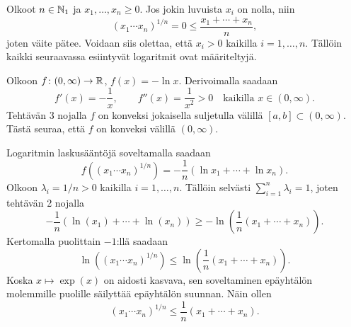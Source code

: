 \documentclass[11pt,a4paper]{amsart}
\begin{document}
\begin{solution}
  Olkoot \(n\in\mathbb{N}_1\) ja \(x_1,\ldots,x_n\geq 0\).
  Jos jokin luvuista \(x_i\) on nolla, niin
  \[
    (x_1\cdots x_n)^{1/n}=0\leq\frac{x_1+\cdots+x_n}{n},
  \]
  joten väite pätee. Voidaan siis olettaa, että \(x_i>0\) kaikilla
  \(i=1,\ldots,n\). Tällöin kaikki seuraavassa esiintyvät logaritmit
  ovat määriteltyjä.

  Olkoon \(f\colon(0,\infty)\to\mathbb{R}\), \(f(x)=-\ln x\).
  Derivoimalla saadaan
  \[
    f'(x)=-\frac{1}{x},
    \qquad f''(x)=\frac{1}{x^2}>0
    \quad\text{kaikilla }x\in(0,\infty).
  \]
  Tehtävän 3 nojalla \(f\) on konveksi jokaisella suljetulla välillä
  \([a,b]\subset(0,\infty)\). Tästä seuraa, että \(f\) on konveksi välillä
  \((0,\infty)\).

  Logaritmin laskusääntöjä soveltamalla saadaan
  \[
    f\left((x_1\cdots x_n)^{1/n}\right)
    =-\frac{1}{n}\left(\ln x_1+\cdots+\ln x_n\right).
  \]
  Olkoon \(\lambda_i=1/n > 0\) kaikilla \(i=1,\ldots,n\). Tällöin selvästi
  \(\sum_{i = 1}^{n} \lambda_i = 1\), joten tehtävän 2 nojalla
  \[
    -\frac{1}{n}\left(\ln(x_1) + \cdots + \ln(x_n)\right) \geq
    -\ln\left(\frac{1}{n}(x_1 + \cdots + x_n)\right).
  \]
  Kertomalla puolittain \(-1\):llä saadaan
  \[
    \ln\left((x_1 \cdots x_n)^{1/n}\right) \leq
    \ln\left(\frac{1}{n}(x_1 + \cdots + x_n)\right).
  \]
  Koska \(x \mapsto \exp(x)\) on aidosti kasvava, sen soveltaminen
  epäyhtälön molemmille puolille säilyttää epäyhtälön suunnan. Näin ollen
  \[
    (x_1 \cdots x_n)^{1/n} \leq
    \frac{1}{n}(x_1 + \cdots + x_n).
  \]
\end{solution}
\end{document}
